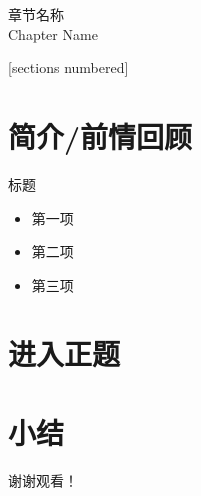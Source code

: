 \documentclass{styles/cuzbeamer}
\begin{document}
    
    \maketitle

    \begin{standout}[第X章]
        章节名称\\
        Chapter Name
    \end{standout}

    \begin{frame}
        [sections numbered]
        \tableofcontents
    \end{frame}

    \section{简介/前情回顾}

    \begin{frame}
        \begin{block}{标题}
            \begin{itemize}
                \item 第一项
                \item 第二项
                \item 第三项
            \end{itemize}
        \end{block}
    \end{frame}

    \section{进入正题}

    \begin{frame}
    \end{frame}

    \section{小结}

    \begin{standout}[]
        谢谢观看！
    \end{standout}
\end{document}
